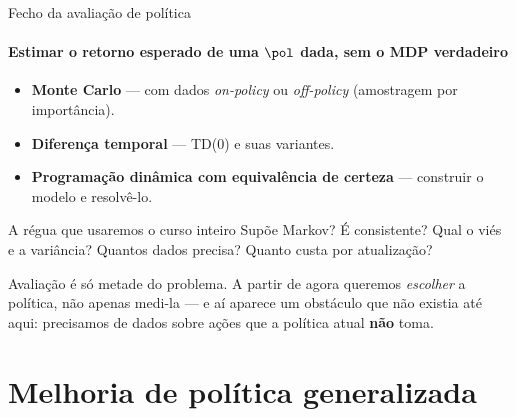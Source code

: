 \documentclass[aspectratio=169, 11pt]{beamer}
\begin{document}
\begin{frame}{Fecho da avaliação de política}
  \framesubtitle{Estimar o retorno esperado de uma $\pol$ dada, sem o MDP verdadeiro}

  \begin{itemize}\setlength{\itemsep}{0.4ex}
    \item \textbf{Monte Carlo} — com dados \emph{on-policy} ou
      \emph{off-policy} (amostragem por importância).
    \item \textbf{Diferença temporal} — TD(0) e suas variantes.
    \item \textbf{Programação dinâmica com equivalência de certeza} —
      construir o modelo e resolvê-lo.
  \end{itemize}

  \vspace{-0.4em}
  \begin{defbox}{A régua que usaremos o curso inteiro}
    Supõe Markov? \; É consistente? \; Qual o viés e a variância? \;
    Quantos dados precisa? \; Quanto custa por atualização?
  \end{defbox}

  \begin{ideiabox}
    Avaliação é só metade do problema. A partir de agora queremos
    \emph{escolher} a política, não apenas medi-la --- e aí aparece um
    obstáculo que não existia até aqui: precisamos de dados sobre ações
    que a política atual \textbf{não} toma.
  \end{ideiabox}
\end{frame}

\section{Melhoria de política generalizada}
\end{document}
